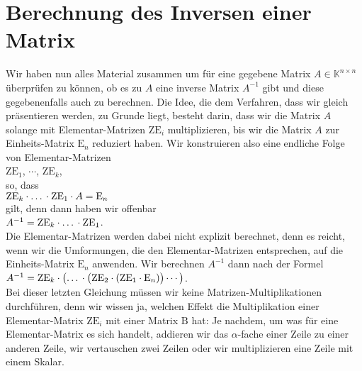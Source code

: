 \section{Berechnung des Inversen einer Matrix}
Wir haben nun alles Material zusammen um f\"{u}r eine gegebene Matrix $A \in \mathbb{K}^{n \times n}$
\"{u}berpr\"{u}fen zu k\"{o}nnen, ob es zu $A$ eine inverse Matrix $A^{-1}$ gibt und diese gegebenenfalls auch
zu berechnen.  Die Idee, die dem Verfahren, dass wir gleich pr\"{a}sentieren werden, zu Grunde liegt,
besteht darin, dass wir die Matrix $A$ solange mit Elementar-Matrizen $\mathrm{ZE}_i$
multiplizieren, bis wir die Matrix $A$ zur Einheits-Matrix $\mathrm{E}_n$ reduziert haben.  
Wir konstruieren also eine endliche Folge von Elementar-Matrizen 
\\[0.2cm]
\hspace*{1.3cm}
$\mathrm{ZE}_1$, $\cdots$, $\mathrm{ZE}_k$,
\\[0.2cm]
so, dass 
\\[0.2cm]
\hspace*{1.3cm}
$\mathrm{ZE}_k \cdot \mbox{\dots} \cdot \mathrm{ZE}_1 \cdot A = \mathrm{E}_n$
\\[0.2cm]
gilt, denn dann haben wir offenbar
\\[0.2cm]
\hspace*{1.3cm}
$A^{-1} = \mathrm{ZE}_k \cdot \mbox{\dots} \cdot \mathrm{ZE}_1$.
\\[0.2cm]
Die Elementar-Matrizen werden dabei nicht explizit berechnet, denn es reicht, wenn wir die
Umformungen, die den Elementar-Matrizen entsprechen, auf die Einheits-Matrix $\mathrm{E}_n$
anwenden.  Wir berechnen $A^{-1}$ dann nach der Formel
\\[0.2cm]
\hspace*{1.3cm}
$A^{-1} = \mathrm{ZE}_k \cdot \bigl(\mbox{\dots} \cdot \bigl(\mathrm{ZE}_2 \cdot (\mathrm{ZE}_1 \cdot \mathrm{E}_n)\bigr) \cdots \bigr)$.
\\[0.2cm]
Bei dieser letzten Gleichung m\"{u}ssen wir keine Matrizen-Multiplikationen durchf\"{u}hren, denn wir wissen
ja, welchen Effekt die Multiplikation einer Elementar-Matrix $\mathrm{ZE}_i$ mit einer Matrix
$\mathrm{B}$ hat:  Je nachdem, um was f\"{u}r eine Elementar-Matrix es sich handelt, addieren wir das
$\alpha$-fache einer Zeile zu einer anderen Zeile, wir vertauschen zwei Zeilen oder wir
multiplizieren eine Zeile mit einem Skalar. 

